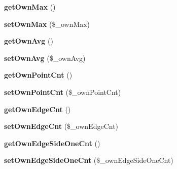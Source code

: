 \begin{DoxyCompactItemize}
\item 
{\bfseries get\+Own\+Max} ()\hypertarget{class_reversi_anz_ae8b22c114dd706252d7ac65db730c4bd}{}\label{class_reversi_anz_ae8b22c114dd706252d7ac65db730c4bd}

\item 
{\bfseries set\+Own\+Max} (\$\+\_\+own\+Max)\hypertarget{class_reversi_anz_a0e115c41bc381831f3f1e19c3214eba7}{}\label{class_reversi_anz_a0e115c41bc381831f3f1e19c3214eba7}

\item 
{\bfseries get\+Own\+Avg} ()\hypertarget{class_reversi_anz_a7dc0022c2e3015837f9443887fa970a1}{}\label{class_reversi_anz_a7dc0022c2e3015837f9443887fa970a1}

\item 
{\bfseries set\+Own\+Avg} (\$\+\_\+own\+Avg)\hypertarget{class_reversi_anz_a7afbb115589b1cd369caf987326b5b83}{}\label{class_reversi_anz_a7afbb115589b1cd369caf987326b5b83}

\item 
{\bfseries get\+Own\+Point\+Cnt} ()\hypertarget{class_reversi_anz_aef6ff585777c6778cb8148833fc41451}{}\label{class_reversi_anz_aef6ff585777c6778cb8148833fc41451}

\item 
{\bfseries set\+Own\+Point\+Cnt} (\$\+\_\+own\+Point\+Cnt)\hypertarget{class_reversi_anz_a1f532e6595b9012475d07f90715fa35f}{}\label{class_reversi_anz_a1f532e6595b9012475d07f90715fa35f}

\item 
{\bfseries get\+Own\+Edge\+Cnt} ()\hypertarget{class_reversi_anz_af630ff89845fd014edd5c53b6fb9f59d}{}\label{class_reversi_anz_af630ff89845fd014edd5c53b6fb9f59d}

\item 
{\bfseries set\+Own\+Edge\+Cnt} (\$\+\_\+own\+Edge\+Cnt)\hypertarget{class_reversi_anz_adb980dd708ea8224fd02212b56d3ce30}{}\label{class_reversi_anz_adb980dd708ea8224fd02212b56d3ce30}

\item 
{\bfseries get\+Own\+Edge\+Side\+One\+Cnt} ()\hypertarget{class_reversi_anz_a04420643dba77a4d180877f38a7b20bb}{}\label{class_reversi_anz_a04420643dba77a4d180877f38a7b20bb}

\item 
{\bfseries set\+Own\+Edge\+Side\+One\+Cnt} (\$\+\_\+own\+Edge\+Side\+One\+Cnt)\hypertarget{class_reversi_anz_af3fbb8b287e10b57b5d926f78f94f096}{}\label{class_reversi_anz_af3fbb8b287e10b57b5d926f78f94f096}


\end{DoxyCompactItemize}
